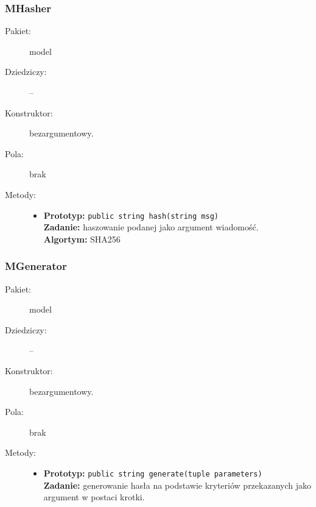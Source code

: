 \documentclass[a4paper]{article}
\newcommand{\prog}{\texttt}
\begin{document}
\subsubsection{MHasher}
\begin{description}
    \item[Pakiet:] model
    \item[Dziedziczy:] --
    \item[Konstruktor:] bezargumentowy.
    \item[Pola:] brak
    \item[Metody:] \hfill
    \begin{itemize}
        \item \textbf{Prototyp:} \prog{public string hash(string msg)}\\\textbf{Zadanie:} haszowanie podanej jako argument wiadomość.\\\textbf{Algortym:} SHA256
    \end{itemize}
\end{description}

\subsubsection{MGenerator}
\begin{description}
    \item[Pakiet:] model
    \item[Dziedziczy:] --
    \item[Konstruktor:] bezargumentowy.
    \item[Pola:] brak
    \item[Metody:] \hfill
    \begin{itemize}
        \item \textbf{Prototyp:} \prog{public string generate(tuple parameters)}\\\textbf{Zadanie:} generowanie hasła na podstawie kryteriów przekazanych jako argument w postaci krotki.
    \end{itemize}
\end{description}
\end{document}
